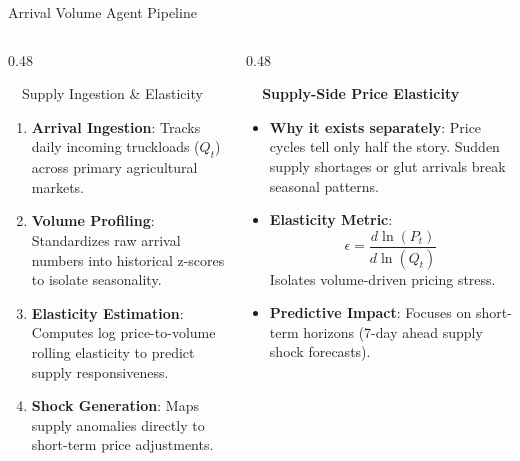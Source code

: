 \documentclass{beamer}
\begin{document}
\begin{frame}{Arrival Volume Agent Pipeline}
\vspace{-0.2cm}

\begin{columns}[T]
    \begin{column}{0.48\textwidth}
        \begin{infocard}{~~Supply Ingestion \& Elasticity}
            \fontsize{6.8pt}{8.5pt}\selectfont
            \begin{enumerate}\setlength\itemsep{3.5pt}\setlength\parskip{0pt}
                \item[\textbf{1.}] \textbf{Arrival Ingestion}: Tracks daily incoming truckloads ($Q_t$) across primary agricultural markets.
                \item[\textbf{2.}] \textbf{Volume Profiling}: Standardizes raw arrival numbers into historical z-scores to isolate seasonality.
                \item[\textbf{3.}] \textbf{Elasticity Estimation}: Computes log price-to-volume rolling elasticity to predict supply responsiveness.
                \item[\textbf{4.}] \textbf{Shock Generation}: Maps supply anomalies directly to short-term price adjustments.
            \end{enumerate}
        \end{infocard}
    \end{column}
    
    \begin{column}{0.48\textwidth}
        \begin{smallcard}[0.98\textwidth, top=3pt, bottom=3pt, left=4pt, right=4pt, boxsep=0.5pt]
            \centering \textbf{\textcolor{primaryDark}{\small {}~~Supply-Side Price Elasticity}}
            \vspace{0.08cm}
            \fontsize{6.8pt}{8.2pt}\selectfont
            \begin{itemize}\setlength\itemsep{4pt}\setlength\parskip{0pt}
                \item \textbf{Why it exists separately}: Price cycles tell only half the story. Sudden supply shortages or glut arrivals break seasonal patterns.
                \item \textbf{Elasticity Metric}:
                \[ \epsilon = \frac{d\ln(P_t)}{d\ln(Q_t)} \]
                Isolates volume-driven pricing stress.
                \item \textbf{Predictive Impact}: Focuses on short-term horizons (7-day ahead supply shock forecasts).
            \end{itemize}
        \end{smallcard}
    \end{column}
\end{columns}


\end{frame}
\end{document}
